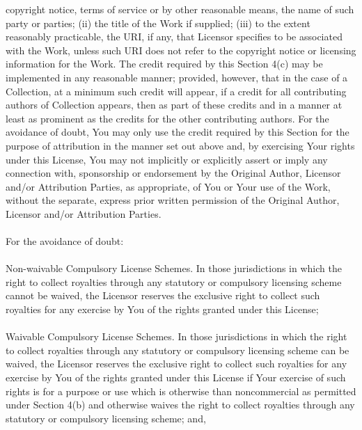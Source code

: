     copyright notice, terms of service or by other reasonable means, the name of
    such party or parties; (ii) the title of the Work if supplied; (iii) to the
    extent reasonably practicable, the URI, if any, that Licensor specifies to
    be associated with the Work, unless such URI does not refer to the copyright
    notice or licensing information for the Work. The credit required by this
    Section 4(c) may be implemented in any reasonable manner; provided, however,
    that in the case of a Collection, at a minimum such credit will appear, if a
    credit for all contributing authors of Collection appears, then as part of
    these credits and in a manner at least as prominent as the credits for the
    other contributing authors. For the avoidance of doubt, You may only use the
    credit required by this Section for the purpose of attribution in the manner
    set out above and, by exercising Your rights under this License, You may not
    implicitly or explicitly assert or imply any connection with, sponsorship or
    endorsement by the Original Author, Licensor and/or Attribution Parties, as
    appropriate, of You or Your use of the Work, without the separate, express
    prior written permission of the Original Author, Licensor and/or Attribution
    Parties.
\\ \\
    For the avoidance of doubt:
    \\ \\
        Non-waivable Compulsory License Schemes. In those jurisdictions in which
        the right to collect royalties through any statutory or compulsory
        licensing scheme cannot be waived, the Licensor reserves the exclusive
        right to collect such royalties for any exercise by You of the rights
        granted under this License; \\ \\
        Waivable Compulsory License Schemes. In those jurisdictions in which the
        right to collect royalties through any statutory or compulsory licensing
        scheme can be waived, the Licensor reserves the exclusive right to
        collect such royalties for any exercise by You of the rights granted
        under this License if Your exercise of such rights is for a purpose or
        use which is otherwise than noncommercial as permitted under Section
        4(b) and otherwise waives the right to collect royalties through any
        statutory or compulsory licensing scheme; and, \\ \\
